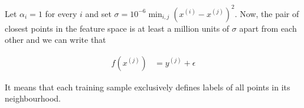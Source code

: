 \documentclass[12pt]{article}
\begin{document}
Let $\alpha_i = 1$ for every $i$ and set $\sigma = 10^{-6} \min_{i, j} \left(x^{(i)} - x^{(j)}\right)^2$. Now, the pair of closest points in the feature space is at least a million units of $\sigma$ apart from each other and we can write that

\begin{equation}
 \begin{align}
    f(x^{(j)}) &= y^{(j)} + \epsilon
 \end{align}
\end{equation}

It means that each training sample exclusively defines labels of all points in its neighbourhood.
\end{document}
